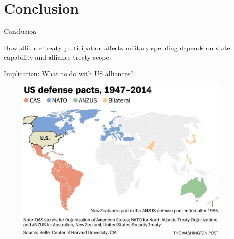 \documentclass{beamer}
\begin{document}

\section{Conclusion}


\begin{frame}{Conclusion}

How alliance treaty participation affects military spending depends on state capability and alliance treaty scope.  

\end{frame}



\begin{frame}{Implication: What to do with US alliances?}

\begin{figure}[htbp]
	\centering
		\includegraphics[width=0.95\textwidth]{nato-map.jpg}
\end{figure}


\end{frame}


\end{document}
